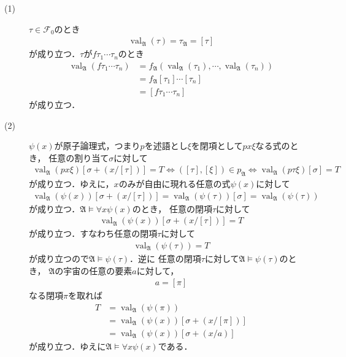 \documentclass[a4j,10.5pt,oneside,openany]{jsbook}
\theoremstyle{mystyle}
\newcommand{\val}{\operatorname{val}} %
\begin{document}
	\begin{description}
		\item[(1)] $\tau \in \mathcal{F}_{0}$のとき
			\begin{align}
				\val_{\mathfrak{A}}(\tau) = \tau_{\mathfrak{A}} = [\tau]
			\end{align}
			が成り立つ．$\tau$が$f\tau_{1}\cdots\tau_{n}$のとき
			\begin{align}
				\val_{\mathfrak{A}}(f\tau_{1}\cdots\tau_{n}) 
				&= f_{\mathfrak{A}}\left(\val_{\mathfrak{A}}(\tau_{1}),
				\cdots, \val_{\mathfrak{A}}(\tau_{n})\right) \\
				&= f_{\mathfrak{A}} [\tau_{1}] \cdots [\tau_{n}] \\
				&= [f\tau_{1}\cdots\tau_{n}]
			\end{align}
			が成り立つ．
		
		\item[(2)] $\psi(x)$が原子論理式，つまり$p$を述語とし$\xi$を閉項として$px\xi$なる式のとき，
			任意の割り当て$\sigma$に対して
			\begin{align}
				\val_{\mathfrak{A}}(px\xi)[\sigma + (x/[\tau])] = T
				\Longleftrightarrow ([\tau],[\xi]) \in p_{\mathfrak{A}}
				\Longleftrightarrow \val_{\mathfrak{A}}(p\tau\xi)[\sigma] = T
			\end{align}
			が成り立つ．ゆえに，$x$のみが自由に現れる任意の式$\psi(x)$に対して
			\begin{align}
				\val_{\mathfrak{A}}(\psi(x))[\sigma + (x/[\tau])]
				= \val_{\mathfrak{A}}(\psi(\tau))[\sigma]
				= \val_{\mathfrak{A}}(\psi(\tau))
			\end{align}
			が成り立つ．$\mathfrak{A} \models \forall x \psi(x)$のとき，
			任意の閉項$\tau$に対して
			\begin{align}
				\val_{\mathfrak{A}}(\psi(x))[\sigma + (x/[\tau])] = T
			\end{align}
			が成り立つ．すなわち任意の閉項$\tau$に対して
			\begin{align}
				\val_{\mathfrak{A}}(\psi(\tau)) = T
			\end{align}
			が成り立つので$\mathfrak{A} \models \psi(\tau)$．逆に
			任意の閉項$\tau$に対して$\mathfrak{A} \models \psi(\tau)$のとき，
			$\mathfrak{A}$の宇宙の任意の要素$a$に対して，
			\begin{align}
				a = [\pi]
			\end{align}
			なる閉項$\pi$を取れば
			\begin{align}
				T &= \val_{\mathfrak{A}}(\psi(\pi)) \\
				&= \val_{\mathfrak{A}}(\psi(x))[\sigma + (x/[\pi])] \\
				&= \val_{\mathfrak{A}}(\psi(x))[\sigma + (x/a)]
			\end{align}
			が成り立つ．ゆえに$\mathfrak{A} \models \forall x \psi(x)$である．
		

\end{description}
\end{document}
